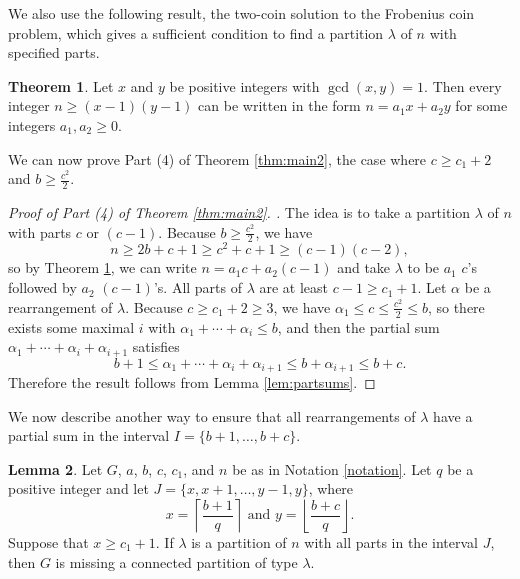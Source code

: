 \documentclass[12pt]{amsart}  %
\theoremstyle{definition}
\newtheorem{theorem}{Theorem}[section]
\newtheorem{lemma}[theorem]{Lemma}
\theoremstyle{remark}
\numberwithin{equation}{section}
\begin{document}
We also use the following result, the two-coin solution to the Frobenius coin problem, which gives a sufficient condition to find a partition $\lambda$ of $n$ with specified parts. 

\begin{theorem} \cite{frobeniuscoin} \label{thm:frobenius} Let $x$ and $y$ be positive integers with $\gcd(x,y)=1$. Then every integer $n\geq (x-1)(y-1)$ can be written in the form $n=a_1x+a_2y$ for some integers $a_1,a_2\geq 0$. 
\end{theorem}

We can now prove Part (4) of Theorem \ref{thm:main2}, the case where $c\geq c_1+2$ and $b\geq\frac{c^2}2$.

\begin{proof}[Proof of Part (4) of Theorem \ref{thm:main2}. ]
The idea is to take a partition $\lambda$ of $n$ with parts $c$ or $(c-1)$. Because $b\geq\frac{c^2}2$, we have
\begin{equation*}
n\geq 2b+c+1\geq c^2+c+1\geq (c-1)(c-2),
\end{equation*} 
so by Theorem \ref{thm:frobenius}, we can write $n=a_1c+a_2(c-1)$ and take $\lambda$ to be $a_1$ $c$'s followed by $a_2$ $(c-1)$'s. All parts of $\lambda$ are at least $c-1\geq c_1+1$. Let $\alpha$ be a rearrangement of $\lambda$. Because $c\geq c_1+2\geq 3$, we have $\alpha_1\leq c\leq\frac{c^2}2\leq b$, so there exists some maximal $i$ with $\alpha_1+\cdots+\alpha_i\leq b$, and then the partial sum $\alpha_1+\cdots+\alpha_i+\alpha_{i+1}$ satisfies
\begin{equation*}
b+1\leq\alpha_1+\cdots+\alpha_i+\alpha_{i+1}\leq b+\alpha_{i+1}\leq b+c.
\end{equation*}
Therefore the result follows from Lemma \ref{lem:partsums}.
\end{proof}

We now describe another way to ensure that all rearrangements of $\lambda$ have a partial sum in the interval $I=\{b+1,\ldots,b+c\}$.

\begin{lemma}\label{lem:q} Let $G$, $a$, $b$, $c$, $c_1$, and $n$ be as in Notation \ref{notation}. Let $q$ be a positive integer and let $J=\{x,x+1,\ldots,y-1,y\}$, where
\begin{equation}
x=\left\lceil\frac{b+1}q\right\rceil\text{ and }y=\left\lfloor\frac{b+c}q\right\rfloor.
\end{equation}
Suppose that $x\geq c_1+1$. If $\lambda$ is a partition of $n$ with all parts in the interval $J$, then $G$ is missing a connected partition of type $\lambda$.
\end{lemma} 
\end{document}
